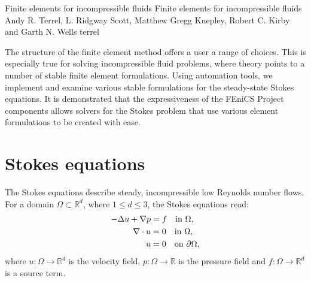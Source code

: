 \begingroup

\setcounter{chapter}{19}
\setcounter{chpnum}{19}


              {Finite elements for incompressible fluids}
              {Finite elements for incompressible fluids}
              {Andy R. Terrel, L. Ridgway Scott, Matthew Gregg Knepley,
               Robert C. Kirby\\ and Garth N. Wells}
              {terrel}

The structure of the finite element method offers a user a range of
choices.  This is especially true for solving incompressible fluid
problems, where theory points to a number of stable finite element
formulations. Using automation tools, we implement and examine various
stable formulations for the steady-state Stokes equations.  It is
demonstrated that the expressiveness of the FEniCS Project components
allows solvers for the Stokes problem that use various element
formulations to be created with ease.



\section{Stokes equations}
\label{sec:terrel:Stokes}

The Stokes equations describe steady, incompressible low Reynolds number
flows. For a domain $\Omega \subset \mathbb{R}^{d}$, where $1 \le d \le
3$, the Stokes equations read:\vspace*{-2.5pt}
%
\begin{align}
     -\Delta u + \nabla p &= f \quad \mbox{in} \ \Omega,
\label{eqn:terrel:StrongStokes}
\\
      \nabla\cdot u &= 0 \quad \mbox{in} \ \Omega,
\label{eqn:terrel:StrongStokes_icomp}
\\
      u &= 0 \quad \mbox{on} \  \partial \Omega,\vspace*{-2.5pt}
\end{align}
%
where $u : \Omega \rightarrow \mathbb{R}^{d}$ is the velocity field,
$p : \Omega \rightarrow \mathbb{R}$ is the pressure field and $f :
\Omega \rightarrow \mathbb{R}^{d}$ is a source term.


